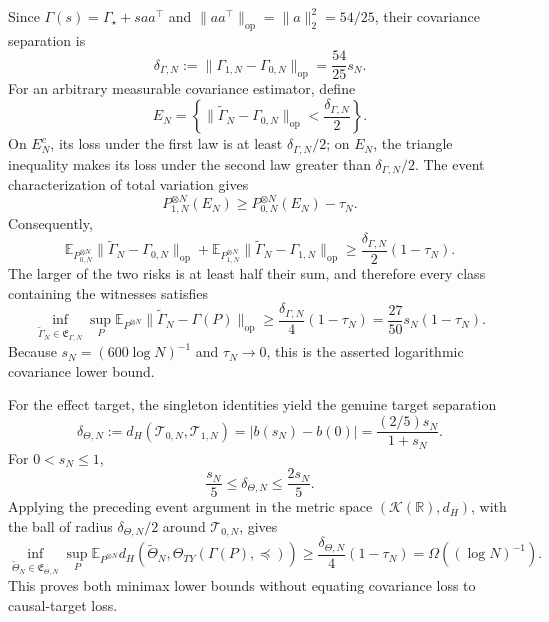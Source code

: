 Since \(\Gamma(s)=\Gamma_\star+saa^\top\) and \(\|aa^\top\|_{\mathrm{op}}=\|a\|_2^2=54/25\), their covariance separation is
\[
 \delta_{\Gamma,N}:=\|\Gamma_{1,N}-\Gamma_{0,N}\|_{\mathrm{op}}
 =\frac{54}{25}s_N.
\]
For an arbitrary measurable covariance estimator, define
\[
 E_N=\left\{\|\widetilde\Gamma_N-\Gamma_{0,N}\|_{\mathrm{op}}<\frac{\delta_{\Gamma,N}}2\right\}.
\]
On \(E_N^c\), its loss under the first law is at least \(\delta_{\Gamma,N}/2\); on \(E_N\), the triangle inequality makes its loss under the second law greater than \(\delta_{\Gamma,N}/2\).  The event characterization of total variation gives
\[
 P_{1,N}^{\otimes N}(E_N)\ge P_{0,N}^{\otimes N}(E_N)-\tau_N.
\]
Consequently,
\[
 \mathbb E_{P_{0,N}^{\otimes N}}\|\widetilde\Gamma_N-\Gamma_{0,N}\|_{\mathrm{op}}
 +\mathbb E_{P_{1,N}^{\otimes N}}\|\widetilde\Gamma_N-\Gamma_{1,N}\|_{\mathrm{op}}
 \ge \frac{\delta_{\Gamma,N}}2(1-\tau_N).
\]
The larger of the two risks is at least half their sum, and therefore every class containing the witnesses satisfies
\[
 \inf_{\widetilde\Gamma_N\in\mathfrak E_{\Gamma,N}}\sup_P
 \mathbb E_{P^{\otimes N}}\|\widetilde\Gamma_N-\Gamma(P)\|_{\mathrm{op}}
 \ge \frac{\delta_{\Gamma,N}}4(1-\tau_N)
 =\frac{27}{50}s_N(1-\tau_N).
\]
Because \(s_N=(600\log N)^{-1}\) and \(\tau_N\to0\), this is the asserted logarithmic covariance lower bound.

For the effect target, the singleton identities yield the genuine target separation
\[
 \delta_{\Theta,N}:=d_H(\mathcal T_{0,N},\mathcal T_{1,N})
 =|b(s_N)-b(0)|
 =\frac{(2/5)s_N}{1+s_N}.
\]
For \(0<s_N\le1\),
\[
 \frac{s_N}{5}\le\delta_{\Theta,N}\le\frac{2s_N}{5}.
\]
Applying the preceding event argument in the metric space \((\mathcal K(\mathbb R),d_H)\), with the ball of radius \(\delta_{\Theta,N}/2\) around \(\mathcal T_{0,N}\), gives
\[
 \inf_{\widetilde\Theta_N\in\mathfrak E_{\Theta,N}}\sup_P
 \mathbb E_{P^{\otimes N}}d_H\!\left(\widetilde\Theta_N,
 \Theta_{TY}(\Gamma(P),\preceq)\right)
 \ge\frac{\delta_{\Theta,N}}4(1-\tau_N)
 =\Omega((\log N)^{-1}).
\]
This proves both minimax lower bounds without equating covariance loss to causal-target loss.

